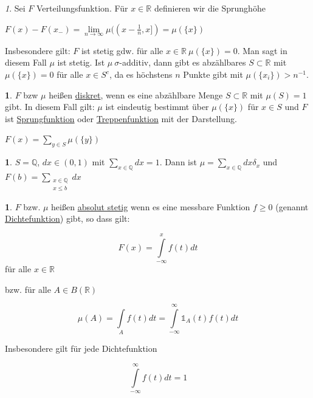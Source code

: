 \documentclass[10pt,a4paper]{report}
\newcommand{\R}{\mathbb{R}}
\numberwithin{equation}{section}
\numberwithin{figure}{section}
\theoremstyle{plain}
\theoremstyle{definition}
\newtheorem{defn}[thm]{\protect\definitionname}
\newtheorem{example}[thm]{\protect\examplename}
\theoremstyle{remark}
\newtheorem{rem}[thm]{\protect\remarkname}
\theoremstyle{plain}
\providecommand{\definitionname}{Definition}
\providecommand{\examplename}{Beispiel}
\providecommand{\remarkname}{Bemerkung}
\newcommand{\1}{ \mathbb{1} } %
\begin{document}
\begin{rem} 
  Sei $F$ Verteilungsfunktion. Für $x \in \R$ definieren wir die
  Sprunghöhe
  \begin{center}
    $F(x)-F(x_-)=\lim\limits_{n \to \infty}
    \mu((x-\frac{1}{n},x])=\mu(\{x\})$
  \end{center}
  Insbesondere gilt: $F$ ist stetig gdw. für alle $x \in \R ~ \mu(\{x\})=0$.
  Man sagt in diesem Fall $\mu$ ist stetig.
  Ist $\mu~ \sigma$-additiv, dann gibt es abzählbares $S \subset \R$ mit $\mu(\{x\})=0$ für alle $x \in S^c$, da es höchstens $n$ Punkte gibt mit $\mu(\{x_i\})>n^{-1}$. 
\end{rem}
\begin{defn}     %
  $F$ bzw $\mu$ heißen \underline{diskret}, wenn es eine abzählbare
  Menge $S \subset \R$ mit $\mu(S)=1$ gibt. In diesem Fall gilt: $\mu$
  ist eindeutig bestimmt über $\mu(\{x\})$ für $x \in S$ und $F$ ist
  \underline{Sprungfunktion} oder \underline{Treppenfunktion} mit der
  Darstellung.
  \begin{center}
    $F(x)=\sum\limits_{y \in S} \mu(\{y\})$
  \end{center}
\end{defn}
\begin{example}
  $S=\mathbb{Q}$, $dx \in (0,1)$ mit $\sum\limits_{x \in \mathbb{Q}} dx=1$. 
  Dann ist $\mu=\sum\limits_{x \in \mathbb{Q} }dx\delta_x$ und $F(b)=\sum\limits_{\substack{x \in \mathbb{Q}\\ x \leq b}} dx$
\end{example}
\begin{defn}   %
  $F$ bzw. $\mu$ heißen \underline{absolut stetig} wenn es eine
  messbare Funktion $f\geq 0$ (genannt \underline{Dichtefunktion})
  gibt, so dass gilt:
  \begin{center}
    \[F(x)=\int\limits_{-\infty}^xf(t)dt\] für alle $x \in \R$
  \end{center}
  bzw. für alle $A \in B(\R)$
  \begin{center}
    \[\mu(A)=\int\limits_A f(t) dt=\int\limits_{-\infty}^\infty
    \1_A(t)f(t)dt\]
  \end{center}
  Insbesondere gilt für jede Dichtefunktion
  \begin{center}
    \[\int\limits_{-\infty}^\infty f(t)dt=1\]
  \end{center}
\end{defn}
\end{document}
